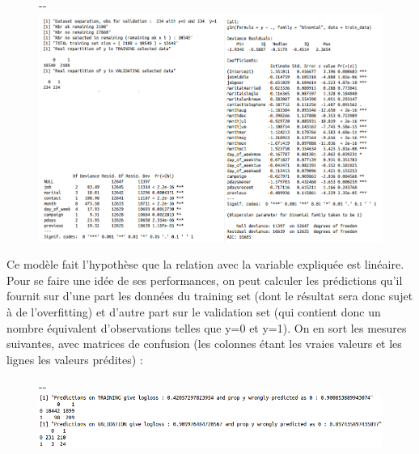 \documentclass[]{article}
\begin{document}
\begin{figure}[!ht]
   \begin{adjustwidth}{-\oddsidemargin-1in}{-\rightmargin}
     \centering
     \includegraphics[width=\paperwidth - 1cm]{callglm}
   \end{adjustwidth}
\end{figure}
\vspace{0.3cm}
Ce modèle fait l'hypothèse que la relation avec la variable expliquée est linéaire. Pour se faire une idée de ses performances, on peut calculer les prédictions qu'il fournit sur d'une part les données du training set (dont le résultat sera donc sujet à de l'overfitting) et d'autre part sur le validation set (qui contient donc un nombre équivalent d'observations telles que y=0 et y=1). On en sort les mesures suivantes, avec matrices de confusion (les colonnes étant les vraies valeurs et les lignes les valeurs prédites) :

\begin{figure}[!ht]
   \begin{adjustwidth}{-\oddsidemargin-1in}{-\rightmargin}
     \centering
     \includegraphics[width=\textwidth]{confmat}
   \end{adjustwidth}
\end{figure}

\newpage
\end{document}
